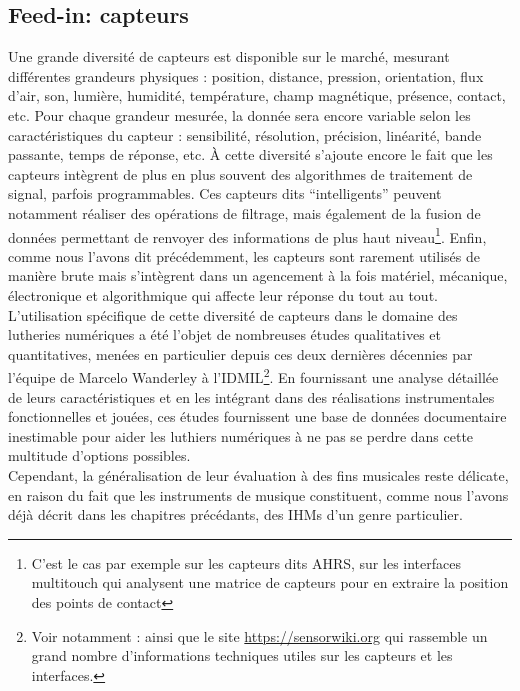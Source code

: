 
\subsection{Feed-in: capteurs}

\noindent Une grande diversité de capteurs est disponible sur le marché, mesurant différentes grandeurs physiques : position, distance, pression, orientation, flux d'air, son, lumière, humidité, température, champ magnétique, présence, contact, etc. Pour chaque grandeur mesurée, la donnée sera encore variable selon les caractéristiques du capteur : sensibilité, résolution, précision, linéarité, bande passante, temps de réponse, etc. À cette diversité s'ajoute encore le fait que les capteurs intègrent de plus en plus souvent des algorithmes de traitement de signal, parfois programmables. Ces capteurs dits ``intelligents'' peuvent notamment réaliser des opérations de filtrage, mais également de la fusion de données permettant de renvoyer des informations de plus haut niveau\footnote{C'est le cas par exemple sur les capteurs dits \gls{AHRS}, sur les interfaces multitouch qui analysent une matrice de capteurs pour en extraire la position des points de contact}. Enfin, comme nous l'avons dit précédemment, les capteurs sont rarement utilisés de manière brute mais s'intègrent dans un agencement à la fois matériel, mécanique, électronique et algorithmique qui affecte leur réponse du tout au tout.\\
\indent L'utilisation spécifique de cette diversité de capteurs dans le domaine des lutheries numériques a été l'objet de nombreuses études qualitatives et quantitatives, menées en particulier depuis ces deux dernières décennies par l'équipe de Marcelo Wanderley à l'\gls{IDMIL}\footnote{Voir notamment : \cite{wanderley_choice_2000, hollinger_evaluation_2006, marshall_sensor_2009, vigliensoni_quantitative_2012, medeiros_comprehensive_2014} ainsi que le site \url{https://sensorwiki.org} qui rassemble un grand nombre d'informations techniques utiles sur les capteurs et les interfaces.}. En fournissant une analyse détaillée de leurs caractéristiques et en les intégrant dans des réalisations instrumentales fonctionnelles et jouées, ces études fournissent une base de données documentaire inestimable pour aider les luthiers numériques à ne pas se perdre dans cette multitude d'options possibles.\\
\indent Cependant, la généralisation de leur évaluation à des fins musicales reste délicate, en raison du fait que les instruments de musique constituent, comme nous l'avons déjà décrit dans les chapitres précédants, des \glspl{IHM} d'un genre particulier.

